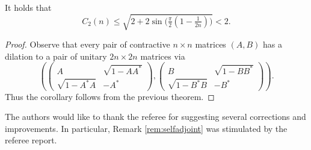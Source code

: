 \begin{corollary}\label{cor:C2n}
It holds that
  \[
    C_2(n)\le\sqrt{2+2\sin\bigl(\tfrac{\pi}{2}(1-\tfrac{1}{2n})\bigr)} < 2.
  \]
\end{corollary}

\begin{proof}
Observe that every pair of contractive $n\times n$ matrices $(A,B)$ has a dilation to a pair of unitary $2n\times2n$ matrices via
  \[
    \left(\begin{pmatrix} A & \sqrt{1-AA^*} \\ \sqrt{1-A^*A} & -A^* \end{pmatrix}, \begin{pmatrix} B  & \sqrt{1-BB^*}\\ \sqrt{1-B^*B} & -B^* \end{pmatrix}\right).
  \]
Thus the corollary follows from the previous theorem. 
\end{proof}


 The authors would like to thank the referee for suggesting several corrections and improvements. In particular, Remark \ref{rem:selfadjoint} was stimulated by the referee report.

